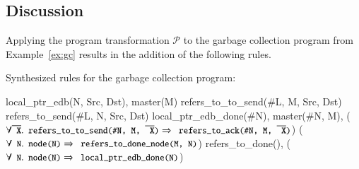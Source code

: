 


\subsection{Discussion}
Applying the program transformation $\mathcal{P}$ to the garbage collection program from Example~\ref{ex:gc} results in the addition of the following rules.

\begin{example}
Synthesized rules for the garbage collection program:

\begin{Drules}
        {local_ptr_edb(N, Src, Dst), master(M)}
        {refers_to_to_send(#L, M, Src, Dst)}
        {refers_to_send(#L, N, Src, Dst)}
        {local_ptr_edb_done(#N), master(#N, M), (\(\forall \od{X}.\dedalus{refers_to_to_send(#N, M, \od{X})} \Rightarrow \dedalus{refers_to_ack(#N, M, \od{X})}\))}
        {(\(\forall \dedalus{N}.\dedalus{node(N)} \Rightarrow \dedalus{refers_to_done_node(M, N)}\))}
        {refers_to_done(), (\(\forall \dedalus{N}.\dedalus{node(N)} \Rightarrow \dedalus{local_ptr_edb_done(N)}\))}
\end{Drules}
\end{example}

